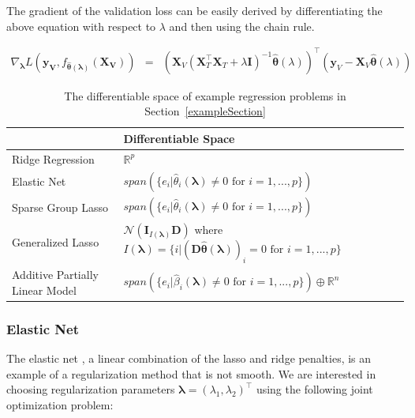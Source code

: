 \documentclass[12pt,letterpaper]{article}
\begin{document}
The gradient of the validation loss can be easily derived by differentiating the above equation with respect to $\lambda$ and then using the chain rule.

\begin{equation}
\begin{array} {lcl}
\nabla_{\boldsymbol \lambda} L(\boldsymbol{y_V}, f_{\hat {\boldsymbol \theta}(\boldsymbol \lambda)}(\boldsymbol{X_V}))
&=& (\boldsymbol{X}_V(\boldsymbol{X}_T^\top \boldsymbol{X}_T + \lambda \boldsymbol{I})^{-1}
\hat{\boldsymbol{\theta}}(\lambda))^{\top}
(\boldsymbol{y}_V - \boldsymbol{X}_V \hat{\boldsymbol{\theta}}(\lambda))
\end{array}
\end{equation}

\begin{table} 
\begin{center}

\begin{tabular}{| l | l | l | }
\hline
 &  Differentiable Space \\
\hline
Ridge Regression & $\mathbb{R}^p$\\
\hline
Elastic Net & $span(\{e_i | \hat{\theta}_i\left(\boldsymbol{\lambda}\right) \ne 0 \text{ for } i=1,...,p \})$\\
\hline
Sparse Group Lasso & $span(\{e_i | \hat{\theta}_i\left(\boldsymbol{\lambda}\right) \ne 0  \text{ for } i=1,...,p \})$ \\
\hline
Generalized Lasso & $\mathcal{N}(\boldsymbol I_{I(\boldsymbol \lambda)} \boldsymbol D)$ where $I(\boldsymbol \lambda) = \{ i | \left(\boldsymbol D \hat{\boldsymbol{\theta}}(\boldsymbol \lambda)\right)_i = 0  \text{ for } i=1,...,p \}$ \\
\hline
Additive Partially Linear Model & $span(\{e_i | \hat{\beta}_i\left(\boldsymbol{\lambda}\right) \ne 0  \text{ for } i=1,...,p \})  \oplus  \mathbb{R}^{n}$\\
\hline
\end{tabular}
\end{center}
\caption {The differentiable space of example regression problems in Section~\ref{exampleSection}}
\label{table:differentiableSpace}
\end{table}

\subsubsection{Elastic Net}\label{sec:enet}

The elastic net \citep{zou2003regression}, a linear combination of the lasso and ridge penalties, is an example of a regularization method that is not smooth. We are interested in choosing regularization parameters $\boldsymbol{\lambda} = (\lambda_1, \lambda_2)^\top$ using the following joint optimization problem:
\end{document}
